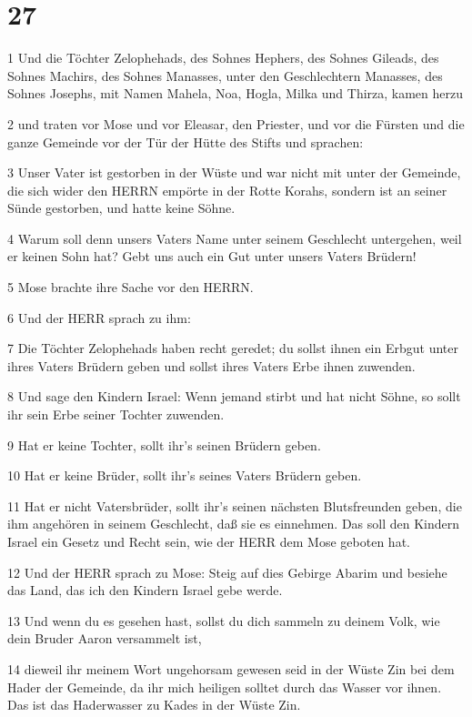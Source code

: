 \chapter{27}

\par 1 Und die Töchter Zelophehads, des Sohnes Hephers, des Sohnes Gileads, des Sohnes Machirs, des Sohnes Manasses, unter den Geschlechtern Manasses, des Sohnes Josephs, mit Namen Mahela, Noa, Hogla, Milka und Thirza, kamen herzu
\par 2 und traten vor Mose und vor Eleasar, den Priester, und vor die Fürsten und die ganze Gemeinde vor der Tür der Hütte des Stifts und sprachen:
\par 3 Unser Vater ist gestorben in der Wüste und war nicht mit unter der Gemeinde, die sich wider den HERRN empörte in der Rotte Korahs, sondern ist an seiner Sünde gestorben, und hatte keine Söhne.
\par 4 Warum soll denn unsers Vaters Name unter seinem Geschlecht untergehen, weil er keinen Sohn hat? Gebt uns auch ein Gut unter unsers Vaters Brüdern!
\par 5 Mose brachte ihre Sache vor den HERRN.
\par 6 Und der HERR sprach zu ihm:
\par 7 Die Töchter Zelophehads haben recht geredet; du sollst ihnen ein Erbgut unter ihres Vaters Brüdern geben und sollst ihres Vaters Erbe ihnen zuwenden.
\par 8 Und sage den Kindern Israel: Wenn jemand stirbt und hat nicht Söhne, so sollt ihr sein Erbe seiner Tochter zuwenden.
\par 9 Hat er keine Tochter, sollt ihr's seinen Brüdern geben.
\par 10 Hat er keine Brüder, sollt ihr's seines Vaters Brüdern geben.
\par 11 Hat er nicht Vatersbrüder, sollt ihr's seinen nächsten Blutsfreunden geben, die ihm angehören in seinem Geschlecht, daß sie es einnehmen. Das soll den Kindern Israel ein Gesetz und Recht sein, wie der HERR dem Mose geboten hat.
\par 12 Und der HERR sprach zu Mose: Steig auf dies Gebirge Abarim und besiehe das Land, das ich den Kindern Israel gebe werde.
\par 13 Und wenn du es gesehen hast, sollst du dich sammeln zu deinem Volk, wie dein Bruder Aaron versammelt ist,
\par 14 dieweil ihr meinem Wort ungehorsam gewesen seid in der Wüste Zin bei dem Hader der Gemeinde, da ihr mich heiligen solltet durch das Wasser vor ihnen. Das ist das Haderwasser zu Kades in der Wüste Zin.
